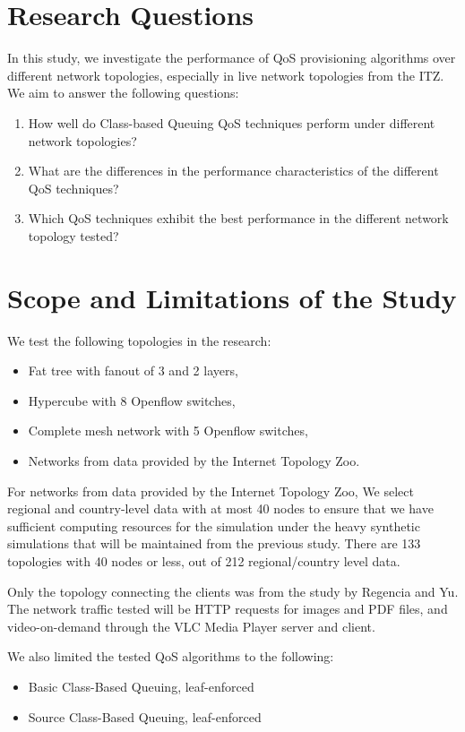 \section{Research Questions}
In this study, we investigate the performance of QoS provisioning algorithms over different network topologies, especially in live network topologies from the ITZ. We aim to answer the following questions:

\begin{enumerate}
    \item How well do Class-based Queuing QoS techniques perform under different network topologies?
    \item What are the differences in the performance characteristics of the different QoS techniques?
    \item Which QoS techniques exhibit the best performance in the different network topology tested?
\end{enumerate}


\section{Scope and Limitations of the Study}

We test the following topologies in the research:
\begin{itemize}
    \item Fat tree with fanout of 3 and 2 layers,
    \item Hypercube with 8 Openflow switches,
    \item Complete mesh network with 5 Openflow switches,
    \item Networks from data provided by the Internet Topology Zoo.
\end{itemize}

For networks from data provided by the Internet Topology Zoo, We select regional and country-level data with at most 40 nodes to ensure that we have sufficient computing resources for the simulation under the heavy synthetic simulations that will be maintained from the previous study. There are 133 topologies with 40 nodes or less, out of 212 regional/country level data. 

Only the topology connecting the clients was from the study by Regencia and Yu. The network traffic tested will be HTTP requests for images and PDF files, and video-on-demand through the VLC Media Player server and client.
    
We also limited the tested QoS algorithms to the following:
\begin{itemize}
    \item Basic Class-Based Queuing, leaf-enforced
    \item Source Class-Based Queuing, leaf-enforced
\end{itemize}

